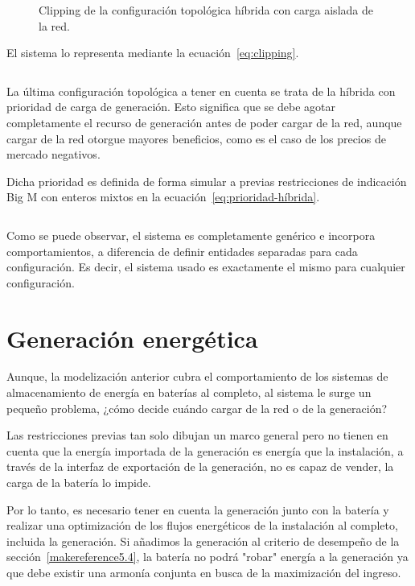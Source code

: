 \begin{figure}
  \centering
  \caption[Clipping de configuración topológica híbrida.]{Clipping de la configuración topológica híbrida con carga aislada de la red.}
  \label{fig:clipping}
\end{figure}

El sistema lo representa mediante la ecuación~\ref{eq:clipping}.

\begin{equation}
  \label{eq:clipping}
\end{equation}

La última configuración topológica a tener en cuenta se trata de la híbrida con prioridad de carga de generación. Esto significa que se debe agotar completamente el recurso de generación antes de poder cargar de la red, aunque cargar de la red otorgue mayores beneficios, como es el caso de los precios de mercado negativos.

Dicha prioridad es definida de forma simular a previas restricciones de indicación Big M con enteros mixtos en la ecuación~\ref{eq:prioridad-híbrida}.

\begin{equation}
  \label{eq:prioridad-híbrida}
\end{equation}

Como se puede observar, el sistema es completamente genérico e incorpora comportamientos, a diferencia de definir entidades separadas para cada configuración. Es decir, el sistema usado es exactamente el mismo para cualquier configuración.

\section{Generación energética}
\label{makereference5.3}

Aunque, la modelización anterior cubra el comportamiento de los sistemas de almacenamiento de energía en baterías al completo, al sistema le surge un pequeño problema, ¿cómo decide cuándo cargar de la red o de la generación?

Las restricciones previas tan solo dibujan un marco general pero no tienen en cuenta que la energía importada de la generación es energía que la instalación, a través de la interfaz de exportación de la generación, no es capaz de vender, la carga de la batería lo impide.

Por lo tanto, es necesario tener en cuenta la generación junto con la batería y realizar una optimización de los flujos energéticos de la instalación al completo, incluida la generación. Si añadimos la generación al criterio de desempeño de la sección~\ref{makereference5.4}, la batería no podrá "robar" energía a la generación ya que debe existir una armonía conjunta en busca de la maximización del ingreso.

